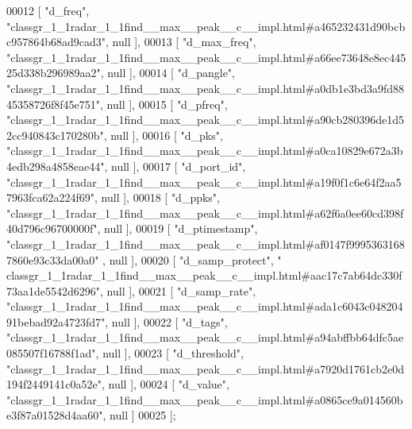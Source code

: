 \begin{DoxyCode}
00012     [ \textcolor{stringliteral}{"d\_freq"}, \textcolor{stringliteral}{"classgr\_1\_1radar\_1\_1find\_\_max\_\_peak\_\_c\_\_impl.html#a465232431d90bcbc957864b68ad9cad3"}, null
       ],
00013     [ \textcolor{stringliteral}{"d\_max\_freq"}, \textcolor{stringliteral}{"classgr\_1\_1radar\_1\_1find\_\_max\_\_peak\_\_c\_\_impl.html#a66ee73648e8ec44525d338b296989aa2"}, 
      null ],
00014     [ \textcolor{stringliteral}{"d\_pangle"}, \textcolor{stringliteral}{"classgr\_1\_1radar\_1\_1find\_\_max\_\_peak\_\_c\_\_impl.html#a0db1e3bd3a9fd8845358726f8f45e751"}, 
      null ],
00015     [ \textcolor{stringliteral}{"d\_pfreq"}, \textcolor{stringliteral}{"classgr\_1\_1radar\_1\_1find\_\_max\_\_peak\_\_c\_\_impl.html#a90cb280396de1d52cc940843c170280b"}, 
      null ],
00016     [ \textcolor{stringliteral}{"d\_pks"}, \textcolor{stringliteral}{"classgr\_1\_1radar\_1\_1find\_\_max\_\_peak\_\_c\_\_impl.html#a0ca10829e672a3b4edb298a4858eae44"}, null 
      ],
00017     [ \textcolor{stringliteral}{"d\_port\_id"}, \textcolor{stringliteral}{"classgr\_1\_1radar\_1\_1find\_\_max\_\_peak\_\_c\_\_impl.html#a19f0f1c6e64f2aa57963fca62a224f69"}, 
      null ],
00018     [ \textcolor{stringliteral}{"d\_ppks"}, \textcolor{stringliteral}{"classgr\_1\_1radar\_1\_1find\_\_max\_\_peak\_\_c\_\_impl.html#a62f6a0ee60cd398f40d796c96700000f"}, null
       ],
00019     [ \textcolor{stringliteral}{"d\_ptimestamp"}, \textcolor{stringliteral}{"classgr\_1\_1radar\_1\_1find\_\_max\_\_peak\_\_c\_\_impl.html#af0147f99953631687860e93c33da00a0"}
      , null ],
00020     [ \textcolor{stringliteral}{"d\_samp\_protect"}, \textcolor{stringliteral}{"
      classgr\_1\_1radar\_1\_1find\_\_max\_\_peak\_\_c\_\_impl.html#aac17c7ab64dc330f73aa1de5542d6296"}, null ],
00021     [ \textcolor{stringliteral}{"d\_samp\_rate"}, \textcolor{stringliteral}{"classgr\_1\_1radar\_1\_1find\_\_max\_\_peak\_\_c\_\_impl.html#ada1c6043c04820491bebad92a4723fd7"},
       null ],
00022     [ \textcolor{stringliteral}{"d\_tags"}, \textcolor{stringliteral}{"classgr\_1\_1radar\_1\_1find\_\_max\_\_peak\_\_c\_\_impl.html#a94abffbb64dfc5ae085507f16788f1ad"}, null
       ],
00023     [ \textcolor{stringliteral}{"d\_threshold"}, \textcolor{stringliteral}{"classgr\_1\_1radar\_1\_1find\_\_max\_\_peak\_\_c\_\_impl.html#a7920d1761cb2e0d194f2449141c0a52e"},
       null ],
00024     [ \textcolor{stringliteral}{"d\_value"}, \textcolor{stringliteral}{"classgr\_1\_1radar\_1\_1find\_\_max\_\_peak\_\_c\_\_impl.html#a0865ce9a014560be3f87a01528d4aa60"}, 
      null ]
00025 ];
\end{DoxyCode}
